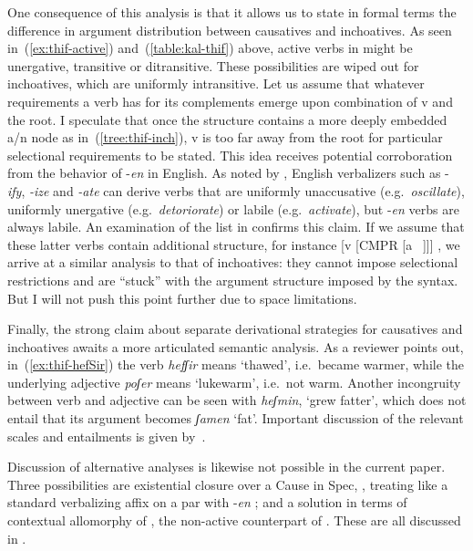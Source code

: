 One consequence of this analysis is that it allows us to state in formal terms the difference in argument distribution between causatives and inchoatives. As seen in~(\ref{ex:thif-active}) and~(\ref{table:kal-thif}) above, active verbs in {\thif} might be unergative, transitive or ditransitive. These possibilities are wiped out for inchoatives, which are uniformly intransitive. Let us assume that whatever requirements a verb has for its complements emerge upon combination of v and the root. I speculate that once the structure contains a more deeply embedded a/n node as in~(\ref{tree:thif-inch}), v is too far away from the root for particular selectional requirements to be stated. This idea receives potential corroboration from the behavior of -\emph{en} in English. As noted by \cite{harley09n}, English verbalizers such as -\emph{ify}, \emph{-ize} and \emph{-ate} can derive verbs that are uniformly unaccusative (e.g.~\emph{oscillate}), uniformly unergative (e.g.~\emph{detoriorate}) or labile (e.g.~\emph{activate}), but -\emph{en} verbs are always labile. An examination of the list in \citet[245]{levin93} confirms this claim. If we assume that these latter verbs contain additional structure, for instance [v [CMPR [a ~\!]]] \citep{bobaljik12}, we arrive at a similar analysis to that of {\thif} inchoatives: they cannot impose selectional restrictions and are ``stuck'' with the argument structure imposed by the syntax. But I will not push this point further due to space limitations.

Finally, the strong claim about separate derivational strategies for causatives and inchoatives awaits a more articulated semantic analysis. As a reviewer points out, in~(\ref{ex:thif-hefSir}) the verb \emph{hefʃir} means `thawed', i.e.~became warmer, while the underlying adjective \emph{poʃer} means `lukewarm', i.e.~not warm. Another incongruity between verb and adjective can be seen with \emph{heʃmin}, `grew fatter', which does not entail that its argument becomes \emph{ʃamen} `fat'. Important discussion of the relevant scales and entailments is given by~\cite{borer91}.


Discussion of alternative analyses is likewise not possible in the current paper. Three possibilities are existential closure over a Cause in Spec,{\vd} \citep{doron03}, treating {\thif} like a standard verbalizing affix on a par with -\emph{en} \citep{borer91}; and a solution in terms of contextual allomorphy of {\vz}, the non-active counterpart of {\vd}. These are all discussed in \citet[81]{kastner16phd}.


